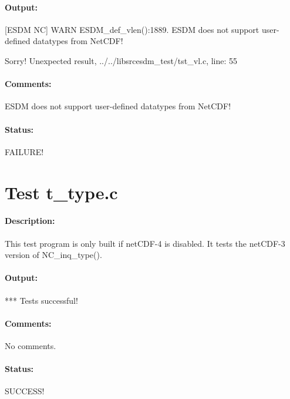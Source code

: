 \paragraph{Output:} [ESDM NC] WARN ESDM\_def\_vlen():1889. ESDM does not support user-defined datatypes from NetCDF!

Sorry! Unexpected result, ../../libsrcesdm\_test/tst\_vl.c, line: 55

\paragraph{Comments:} ESDM does not support user-defined datatypes from NetCDF!

\paragraph{Status:} FAILURE!

\section{Test t\_type.c}

\paragraph{Description:} This test program is only built if netCDF-4 is disabled. It tests
   the netCDF-3 version of NC\_inq\_type().

\paragraph{Output:} *** Tests successful!

\paragraph{Comments:} No comments.

\paragraph{Status:} SUCCESS!
